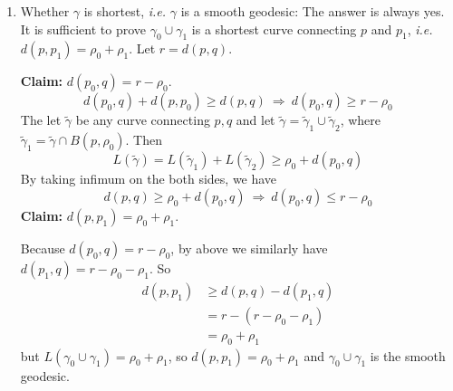 \begin{enumerate}[label=\Roman*.]
	\item Whether $\gamma$ is shortest, \emph{i.e.} $\gamma$ is a smooth geodesic: The answer is always yes. It is sufficient to prove $\gamma_0\cup\gamma_1$ is a shortest curve connecting $p$ and $p_1$, \emph{i.e.} $d(p,p_1) = \rho_0+\rho_1$. Let $r = d(p,q)$.

	\noindent \textbf{Claim:} $d(p_0,q) = r-\rho_0$.
	\begin{equation*}
	 	d(p_0,q) + d(p,p_0) \geq d(p,q)~\Rightarrow~d(p_0,q) \geq r - \rho_0
	\end{equation*} 
	The let $\tilde{\gamma}$ be any curve connecting $p,q$ and let $\tilde{\gamma} = \tilde{\gamma}_1 \cup \tilde{\gamma}_2$, where $\tilde{\gamma}_1 = \tilde{\gamma} \cap B(p,\rho_0)$. Then
	\begin{equation*}
		L(\tilde{\gamma}) = L(\tilde{\gamma}_1) + L(\tilde{\gamma}_2) \geq \rho_0 + d(p_0,q)
	\end{equation*}
	By taking infimum on the both sides, we have
	\begin{equation*}
		d(p,q) \geq \rho_0 + d(p_0,q)~\Rightarrow~d(p_0,q) \leq r - \rho_0
	\end{equation*}
	\noindent \textbf{Claim:} $d(p,p_1) = \rho_0+\rho_1$.

	\noindent Because $d(p_0,q) = r-\rho_0$, by above we similarly have $d(p_1,q) = r-\rho_0-\rho_1$. So
	\begin{equation*}
		\begin{aligned}
			d(p,p_1) &\geq d(p,q) - d(p_1,q) \\
			&= r - (r-\rho_0-\rho_1) \\
			&= \rho_0+\rho_1
		\end{aligned}
	\end{equation*}
	but $L(\gamma_0 \cup \gamma_1) = \rho_0+\rho_1$, so $d(p,p_1) = \rho_0+\rho_1$ and $\gamma_0 \cup \gamma_1$ is the smooth geodesic.


\end{enumerate}
